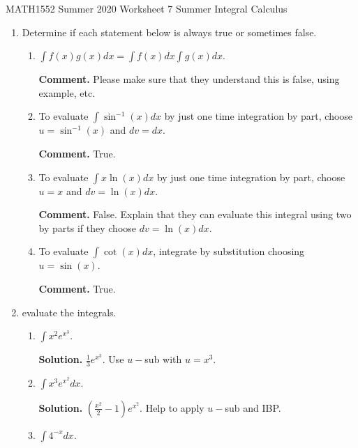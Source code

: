 \documentclass[12pt]{article}
\begin{document}
\noindent
MATH1552 Summer 2020
\hspace{2.2cm}
Worksheet 7 Summer
\hspace{2cm} Integral Calculus

\vspace{2mm}


\begin{enumerate}

\item Determine if each statement below is always true or sometimes false.


\begin{enumerate}
\item $\int f(x)g(x)dx=\int f(x)dx\int g(x)dx$.

\textbf{Comment. } Please make sure that they understand this is false, using example, etc.

\item To evaluate $\int \sin^{-1}(x)dx$ by just one time integration by part, choose $u= \sin^{-1}(x)$ and $dv=dx$.

\textbf{Comment. }True. 

\item To evaluate $\int x\ln(x)dx$ by just one time integration by part, choose $u= x$ and $dv=\ln(x)dx$.

\textbf{Comment. }False. Explain that they can evaluate this integral using two by parts if they choose $dv = \ln(x)dx$.

\item  To evaluate $\int \cot(x)dx$, integrate by substitution choosing $u= \sin(x)$. 

\textbf{Comment. }True. 

\end{enumerate}

\item evaluate the integrals.

\begin{enumerate}
\item $\int x^2 e^{x^3}$.

\textbf{Solution. }$\frac{1}{3}e^{x^3}$. Use $u-$sub with $u=x^3$.

\item $\int x^3 e^{x^2}dx$.

\textbf{Solution. }$(\frac{x^2}{2}-1)e^{x^2}$. Help to apply $u-$sub and IBP.

\item  $\int 4^{-x}dx$.


\end{enumerate}
\end{enumerate}
\end{document}
